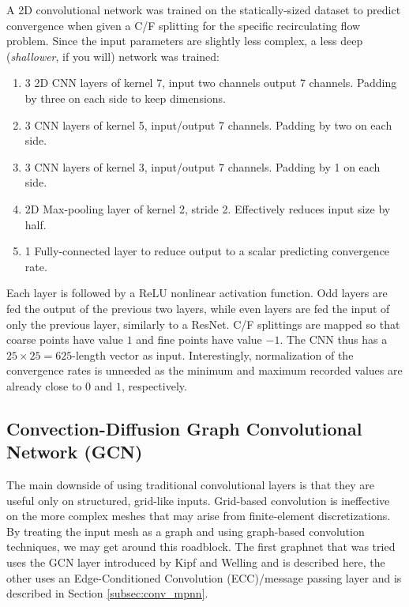 \documentclass{siamart190516}
\begin{document}
A 2D convolutional network was trained on the statically-sized dataset to predict convergence when given a C/F splitting for the specific recirculating flow problem.  Since the input parameters are slightly less complex, a less deep (\textit{shallower}, if you will) network was trained:
%
\begin{enumerate}
\item 3 2D CNN layers of kernel 7, input two channels output 7 channels.  Padding by three on each side to keep dimensions.
\item 3 CNN layers of kernel 5, input/output 7 channels.  Padding by two on each side.
\item 3 CNN layers of kernel 3, input/output 7 channels.  Padding by 1 on each side.
\item 2D Max-pooling layer of kernel 2, stride 2.  Effectively reduces input size by half.
\item 1 Fully-connected layer to reduce output to a scalar predicting convergence rate.
\end{enumerate}
%
Each layer is followed by a ReLU nonlinear activation function.  Odd layers are fed the output of the previous two layers, while even layers are fed the input of only the previous layer, similarly to a ResNet\cite{huang2018densely,he2015deep}.  C/F splittings are mapped so that coarse points have value $1$ and fine points have value $-1$.  The CNN thus has a $25\times 25=625$-length vector as input.  Interestingly, normalization of the convergence rates is unneeded as the minimum and maximum recorded values are already close to $0$ and $1$, respectively.

\subsection{Convection-Diffusion Graph Convolutional Network (GCN)}\label{subsec:conv_gcn}

The main downside of using traditional convolutional layers is that they are useful only on structured, grid-like inputs.  Grid-based convolution is ineffective on the more complex meshes that may arise from finite-element discretizations.  By treating the input mesh as a graph and using graph-based convolution techniques, we may get around this roadblock.  The first graphnet that was tried uses the GCN layer introduced by Kipf and Welling\cite{gcn} and is described here, the other uses an Edge-Conditioned Convolution (ECC)/message passing layer and is described in Section \ref{subsec:conv_mpnn}.
\end{document}
